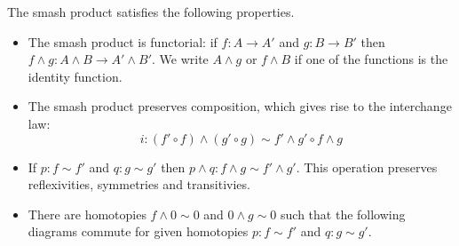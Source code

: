 \documentclass{article}
\newcommand{\pmap}{\to}
\newcommand{\smsh}{\wedge}
\renewcommand{\o}{\ensuremath{\circ}}
\begin{document}
\begin{lem}\mbox{}\label{lem:smash-general}
	The smash product satisfies the following properties.
  \begin{itemize}
  \item The smash product is functorial: if $f:A\pmap A'$ and $g:B\pmap B'$ then
    $f\smsh g:A\smsh B\pmap A'\smsh B'$. We write $A\smsh g$ or $f\smsh B$ if one of the
    functions is the identity function.
  \item The smash product preserves composition, which gives rise to the interchange law:
    \[i:(f' \o f)\smsh (g' \o g) \sim f' \smsh g' \o f \smsh g\]
  \item If $p:f\sim f'$ and $q:g\sim g'$ then $p\smsh q:f\smsh g\sim f'\smsh g'$. This operation
    preserves reflexivities, symmetries and transitivies.
  \item There are homotopies $f\smsh0\sim0$ and $0\smsh g\sim 0$ such that the following diagrams
    commute for given homotopies $p : f\sim f'$ and $q : g\sim g'$.
    \begin{center}
\qquad
{}
\end{center}

  \end{itemize}
\end{lem}
\end{document}
